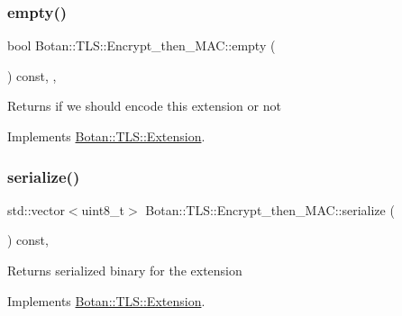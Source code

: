 \subsubsection{\texorpdfstring{empty()}{empty()}}
{\footnotesize\ttfamily bool Botan\+::\+T\+L\+S\+::\+Encrypt\+\_\+then\+\_\+\+M\+A\+C\+::empty (\begin{DoxyParamCaption}{ }\end{DoxyParamCaption}) const\hspace{0.3cm}{\ttfamily [inline]}, {\ttfamily [override]}, {\ttfamily [virtual]}}

\begin{DoxyReturn}{Returns}
if we should encode this extension or not 
\end{DoxyReturn}


Implements \hyperlink{class_botan_1_1_t_l_s_1_1_extension_aa850b9be2322f94e7c65e583cd51acc5}{Botan\+::\+T\+L\+S\+::\+Extension}.

\mbox{\label{class_botan_1_1_t_l_s_1_1_encrypt__then___m_a_c_a1d58c33517e89c8e0daa7327bd4783ba}} 
\subsubsection{\texorpdfstring{serialize()}{serialize()}}
{\footnotesize\ttfamily std\+::vector$<$uint8\+\_\+t$>$ Botan\+::\+T\+L\+S\+::\+Encrypt\+\_\+then\+\_\+\+M\+A\+C\+::serialize (\begin{DoxyParamCaption}{ }\end{DoxyParamCaption}) const\hspace{0.3cm}{\ttfamily [override]}, {\ttfamily [virtual]}}

\begin{DoxyReturn}{Returns}
serialized binary for the extension 
\end{DoxyReturn}


Implements \hyperlink{class_botan_1_1_t_l_s_1_1_extension_a56788726ad2526db54e5a26039cb69db}{Botan\+::\+T\+L\+S\+::\+Extension}.

\mbox{\label{class_botan_1_1_t_l_s_1_1_encrypt__then___m_a_c_a56854b4e65b0cf1395b3b053df42f4f3}} 
